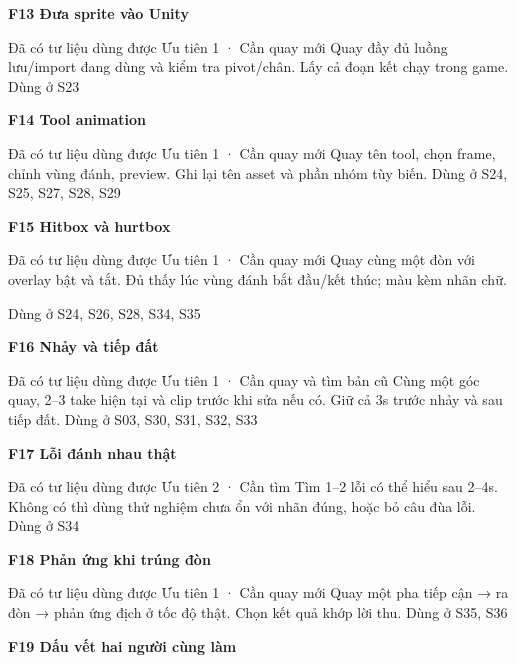 \documentclass[10pt,a4paper]{article}
\begin{document}
\textbf{F13 Đưa sprite vào Unity}\par

Đã có tư liệu dùng được Ưu tiên 1 · Cần quay mới Quay đầy đủ luồng lưu/import đang dùng và kiểm tra pivot/chân. Lấy cả đoạn kết chạy trong game. Dùng ở S23\par

\textbf{F14 Tool animation}\par

Đã có tư liệu dùng được Ưu tiên 1 · Cần quay mới Quay tên tool, chọn frame, chỉnh vùng đánh, preview. Ghi lại tên asset và phần nhóm tùy biến. Dùng ở S24, S25, S27, S28, S29\par

\textbf{F15 Hitbox và hurtbox}\par

Đã có tư liệu dùng được Ưu tiên 1 · Cần quay mới Quay cùng một đòn với overlay bật và tắt. Đủ thấy lúc vùng đánh bắt đầu/kết thúc; màu kèm nhãn chữ.\par

\clearpage

Dùng ở S24, S26, S28, S34, S35\par

\textbf{F16 Nhảy và tiếp đất}\par

Đã có tư liệu dùng được Ưu tiên 1 · Cần quay và tìm bản cũ Cùng một góc quay, 2–3 take hiện tại và clip trước khi sửa nếu có. Giữ cả 3s trước nhảy và sau tiếp đất. Dùng ở S03, S30, S31, S32, S33\par

\textbf{F17 Lỗi đánh nhau thật}\par

Đã có tư liệu dùng được Ưu tiên 2 · Cần tìm Tìm 1–2 lỗi có thể hiểu sau 2–4s. Không có thì dùng thử nghiệm chưa ổn với nhãn đúng, hoặc bỏ câu đùa lỗi. Dùng ở S34\par

\textbf{F18 Phản ứng khi trúng đòn}\par

Đã có tư liệu dùng được Ưu tiên 1 · Cần quay mới Quay một pha tiếp cận → ra đòn → phản ứng địch ở tốc độ thật. Chọn kết quả khớp lời thu. Dùng ở S35, S36\par

\textbf{F19 Dấu vết hai người cùng làm}\par
\end{document}
